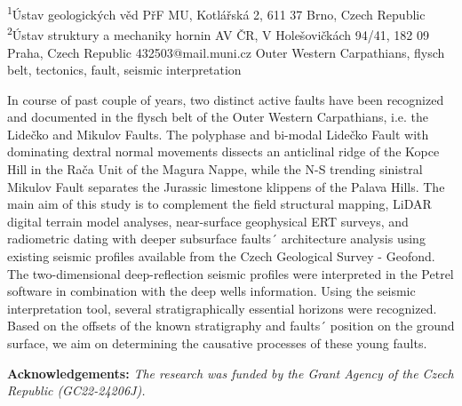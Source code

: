 {
	\textsuperscript{1}Ústav geologických věd PřF MU, Kotlářská 2, 611 37 Brno, Czech Republic\\
	\textsuperscript{2}Ústav struktury a mechaniky hornin AV ČR, V Holešovičkách 94/41, 182 09 Praha, Czech Republic
}
{432503@mail.muni.cz}  %
{Outer Western Carpathians, flysch belt, tectonics, fault, seismic interpretation}
{In course of past couple of years, two distinct active faults have been recognized and documented in the flysch belt of the Outer Western Carpathians, i.e. the Lidečko and Mikulov Faults. The polyphase and bi-modal Lidečko Fault with dominating dextral normal movements dissects an anticlinal ridge of the Kopce Hill in the Rača Unit of the Magura Nappe, while the N-S trending sinistral Mikulov Fault separates the Jurassic limestone klippens of the Palava Hills. The main aim of this study is to complement the field structural mapping, LiDAR digital terrain model analyses, near-surface geophysical ERT surveys, and radiometric dating with deeper subsurface faults´ architecture analysis using existing seismic profiles available from the Czech Geological Survey - Geofond. The two-dimensional deep-reflection seismic profiles were interpreted in the Petrel software in combination with the deep wells information. Using the seismic interpretation tool, several stratigraphically essential horizons were recognized. Based on the offsets of the known stratigraphy and faults´ position on the ground surface, we aim on determining the causative processes of these young faults.

\vspace{0.5em}
\noindent
\textbf{Acknowledgements:}
\textit{The research was funded by the Grant Agency of the Czech Republic (GC22-24206J).}
}
{
}


